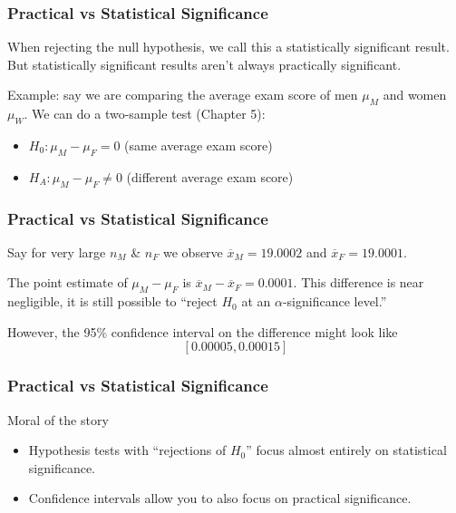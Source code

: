 \documentclass[handout]{beamer}
\newcommand{\blue}[1]{\textcolor{blue2}{#1}}
\newcommand{\xbar}{\overline{x}}
\begin{document}
\begin{frame}
\frametitle{Practical vs Statistical Significance}
When rejecting the null hypothesis, we call this a \blue{statistically significant} result.  But statistically significant results aren't always \blue{practically significant}.

\pause\vspace{0.5cm}

Example: say we are comparing the average exam score of men $\mu_M$ and women $\mu_W$.  We can do a two-sample test (Chapter 5):

\begin{itemize}
\item $H_0: \mu_M - \mu_F = 0$ (same average exam score)
\item $H_A: \mu_M - \mu_F \neq 0$ (different average exam score)
\end{itemize}

\end{frame}


\begin{frame}
\frametitle{Practical vs Statistical Significance}
Say for \blue{very} large $n_M$ \& $n_F$ we observe $\xbar_M = 19.0002$ and $\xbar_F = 19.0001$.

\pause\vspace{0.5cm}

The point estimate of $\mu_M - \mu_F$ is $\xbar_M - \xbar_F = 0.0001$.  This difference is near negligible, it is still possible to ``reject $H_0$ at an $\alpha$-significance level.''  

\pause\vspace{0.5cm}

However, the 95\% confidence interval on the difference might look like
\[
[0.00005, 0.00015]
\]

\end{frame}


\begin{frame}
\frametitle{Practical vs Statistical Significance}

Moral of the story

\pause\begin{itemize}
\item Hypothesis tests with ``rejections of $H_0$'' focus almost entirely on \blue{statistical significance}.
\item Confidence intervals allow you to also focus on \blue{practical significance}.  
\end{itemize}

\end{frame}
\end{document}

